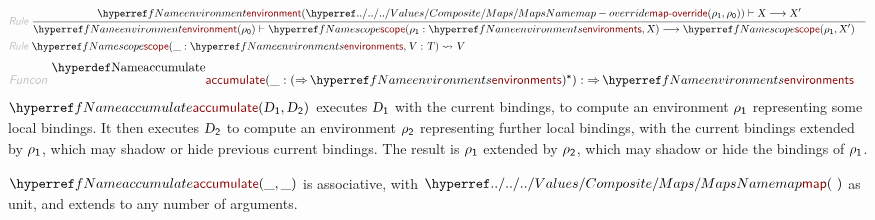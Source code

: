 \begin{align*}
  \KEY{Rule} ~ 
    & \RULE{
      \NAMEREF{environment} ( \NAMEHYPER{../../../Values/Composite}{Maps}{map-override}
                               ( \VAR{$\rho$}\SUB{1},   
                                 \VAR{$\rho$}\SUB{0} ) ) \vdash \VAR{X} \TRANS 
        \VAR{X}'
      }{
      & \NAMEREF{environment} ( \VAR{$\rho$}\SUB{0} ) \vdash \NAMEREF{scope}
                      ( \VAR{$\rho$}\SUB{1} : \NAMEREF{environments},   
                        \VAR{X} ) \TRANS 
          \NAMEREF{scope}
            ( \VAR{$\rho$}\SUB{1},   
              \VAR{X}' )
      }
\\
  \KEY{Rule} ~ 
    & \NAMEREF{scope}
        ( \_ : \NAMEREF{environments},   
          \VAR{V} : \VAR{T} ) \leadsto
        \VAR{V}
\end{align*}
\begin{align*}
  \KEY{Funcon} ~ 
  & \NAMEDECL{accumulate}(\_ : (  \TO \NAMEREF{environments} )\STAR) :  \TO \NAMEREF{environments}
\end{align*}
$\SHADE{\NAMEREF{accumulate}
           ( \VAR{D}\SUB{1},   
             \VAR{D}\SUB{2} )}$ executes $\SHADE{\VAR{D}\SUB{1}}$ with the current bindings, to compute an
  environment $\SHADE{\VAR{$\rho$}\SUB{1}}$ representing some local bindings. It then executes $\SHADE{\VAR{D}\SUB{2}}$ to
  compute an environment $\SHADE{\VAR{$\rho$}\SUB{2}}$ representing further local bindings, with the
  current bindings extended by $\SHADE{\VAR{$\rho$}\SUB{1}}$, which may shadow or hide previous
  current bindings. The result is $\SHADE{\VAR{$\rho$}\SUB{1}}$ extended by $\SHADE{\VAR{$\rho$}\SUB{2}}$, which may shadow
  or hide the bindings of $\SHADE{\VAR{$\rho$}\SUB{1}}$.

$\SHADE{\NAMEREF{accumulate}
           ( \_,   
             \_ )}$ is associative, with $\SHADE{\NAMEHYPER{../../../Values/Composite}{Maps}{map}
           (  ~  )}$ as unit, and extends to any
  number of arguments.

